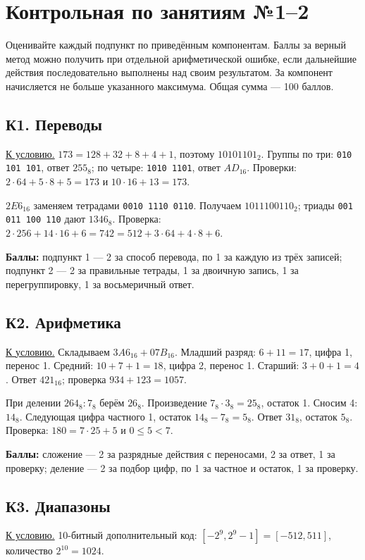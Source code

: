 \section{Контрольная по занятиям №1--2}\label{solutions:mock}
Оценивайте каждый подпункт по приведённым компонентам. Баллы за верный метод можно получить при отдельной арифметической ошибке, если дальнейшие действия последовательно выполнены над своим результатом. За компонент начисляется не больше указанного максимума. Общая сумма --- 100 баллов.

\subsection*{К1. Переводы}\label{sol:k1}
\hyperref[task:k1]{К условию.}
$173=128+32+8+4+1$, поэтому $10101101_2$. Группы по три: \texttt{010 101 101}, ответ $255_8$; по четыре: \texttt{1010 1101}, ответ $AD_{16}$. Проверки: $2\cdot64+5\cdot8+5=173$ и $10\cdot16+13=173$.

$2E6_{16}$ заменяем тетрадами \texttt{0010 1110 0110}. Получаем $1011100110_2$; триады \texttt{001 011 100 110} дают $1346_8$. Проверка: $2\cdot256+14\cdot16+6=742=512+3\cdot64+4\cdot8+6$.

\textbf{Баллы:} подпункт 1 --- 2 за способ перевода, по 1 за каждую из трёх записей; подпункт 2 --- 2 за правильные тетрады, 1 за двоичную запись, 1 за перегруппировку, 1 за восьмеричный ответ.

\subsection*{К2. Арифметика}\label{sol:k2}
\hyperref[task:k2]{К условию.}
Складываем $3A6_{16}+07B_{16}$. Младший разряд: $6+11=17$, цифра 1, перенос 1. Средний: $10+7+1=18$, цифра 2, перенос 1. Старший: $3+0+1=4$. Ответ $421_{16}$; проверка $934+123=1057$.

При делении $264_8:7_8$ берём $26_8$. Произведение $7_8\cdot3_8=25_8$, остаток 1. Сносим 4: $14_8$. Следующая цифра частного 1, остаток $14_8-7_8=5_8$. Ответ $31_8$, остаток $5_8$. Проверка: $180=7\cdot25+5$ и $0\le5<7$.

\textbf{Баллы:} сложение --- 2 за разрядные действия с переносами, 2 за ответ, 1 за проверку; деление --- 2 за подбор цифр, по 1 за частное и остаток, 1 за проверку.

\subsection*{К3. Диапазоны}\label{sol:k3}
\hyperref[task:k3]{К условию.}
10-битный дополнительный код: $[-2^9,2^9-1]=[-512,511]$, количество $2^{10}=1024$.

